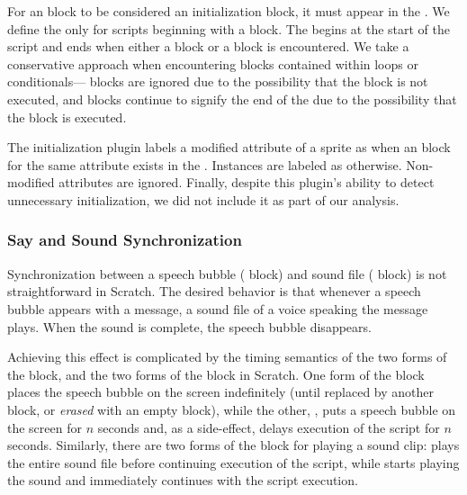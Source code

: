 For an \abs{} block to be considered an initialization block, it must appear in
the \initzone{}. We define the \initzone{} only for scripts beginning with a
\greenflag{} block. The \initzone{} begins at the start of the script and ends
when either a \rel{} block or a \broadcast{} block is encountered. We take a
conservative approach when encountering blocks contained within loops or
conditionals---\abs{} blocks are ignored due to the possibility that the block
is not executed, and \rel{} blocks continue to signify the end of the
\initzone{} due to the possibility that the block is executed.

The initialization plugin labels a modified attribute of a sprite as \correct{}
when an \abs{} block for the same attribute exists in the
\initzone{}. Instances are labeled as \incor{} otherwise. Non-modified
attributes are ignored. Finally, despite this plugin's ability to detect
unnecessary initialization, we did not include it as part of our analysis.


\subsubsection{Say and Sound Synchronization}
Synchronization between a speech bubble (\say{} block) and sound file
(\playsound{} block) is not straightforward in Scratch. The desired behavior is
that whenever a speech bubble appears with a message, a sound file of a voice
speaking the message plays. When the sound is complete, the speech bubble
disappears.

Achieving this effect is complicated by the timing semantics of the two forms
of the \say{} block, and the two forms of the \playsound{} block in Scratch.
One form of the \say{} block places the speech bubble on the screen
indefinitely (until replaced by another \say{} block, or \emph{erased} with an
empty \say{} block), while the other, \sayfor{}, puts a speech bubble on the
screen for $n$ seconds and, as a side-effect, delays execution of the script
for $n$ seconds. Similarly, there are two forms of the block for playing a
sound clip: \playsounddone{} plays the entire sound file before continuing
execution of the script, while \playsound{} starts playing the sound and
immediately continues with the script execution.

